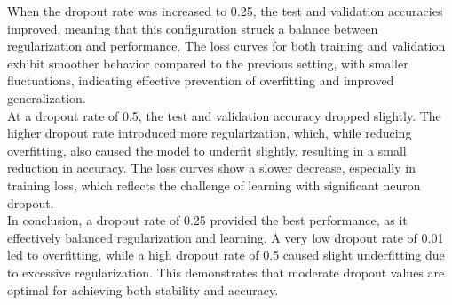 \documentclass[12pt,a4paper]{article}
\begin{document}
        When the dropout rate was increased to 0.25, the test and validation accuracies improved, meaning that this configuration struck a balance between regularization and performance. The loss curves for both training and validation exhibit smoother behavior compared to the previous setting, with smaller fluctuations, indicating effective prevention of overfitting and improved generalization. \\
        At a dropout rate of 0.5, the test and validation accuracy dropped slightly. The higher dropout rate introduced more regularization, which, while reducing overfitting, also caused the model to underfit slightly, resulting in a small reduction in accuracy. The loss curves show a slower decrease, especially in training loss, which reflects the challenge of learning with significant neuron dropout. \\
        In conclusion, a dropout rate of 0.25 provided the best performance, as it effectively balanced regularization and learning. A very low dropout rate of 0.01 led to overfitting, while a high dropout rate of 0.5 caused slight underfitting due to excessive regularization. This demonstrates that moderate dropout values are optimal for achieving both stability and accuracy.

    \newpage
\end{document}
